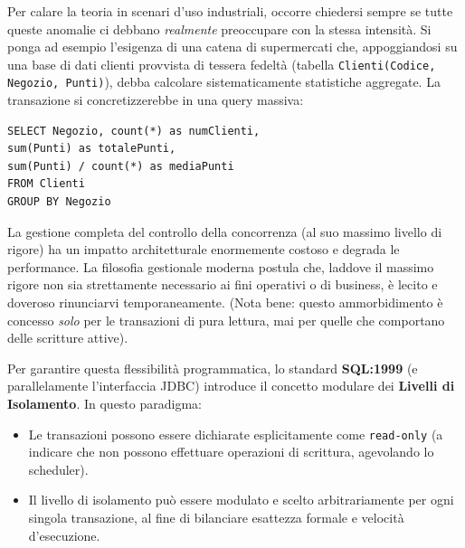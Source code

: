 Per calare la teoria in scenari d'uso industriali, occorre chiedersi sempre se tutte queste anomalie ci debbano \textit{realmente} preoccupare con la stessa intensità.
Si ponga ad esempio l'esigenza di una catena di supermercati che, appoggiandosi su una base di dati clienti provvista di tessera fedeltà (tabella \texttt{Clienti(Codice, Negozio, Punti)}), debba calcolare sistematicamente statistiche aggregate. La transazione si concretizzerebbe in una query massiva:
\begin{verbatim}
SELECT Negozio, count(*) as numClienti,
sum(Punti) as totalePunti,
sum(Punti) / count(*) as mediaPunti
FROM Clienti
GROUP BY Negozio
\end{verbatim}

La gestione completa del controllo della concorrenza (al suo massimo livello di rigore) ha un impatto architetturale enormemente costoso e degrada le performance. La filosofia gestionale moderna postula che, laddove il massimo rigore non sia strettamente necessario ai fini operativi o di business, è lecito e doveroso rinunciarvi temporaneamente. (Nota bene: questo ammorbidimento è concesso \textit{solo} per le transazioni di pura lettura, mai per quelle che comportano delle scritture attive).

Per garantire questa flessibilità programmatica, lo standard \textbf{SQL:1999} (e parallelamente l'interfaccia JDBC) introduce il concetto modulare dei \textbf{Livelli di Isolamento}. In questo paradigma:
\begin{itemize}
    \item Le transazioni possono essere dichiarate esplicitamente come \texttt{read-only} (a indicare che non possono effettuare operazioni di scrittura, agevolando lo scheduler).
    \item Il livello di isolamento può essere modulato e scelto arbitrariamente per ogni singola transazione, al fine di bilanciare esattezza formale e velocità d'esecuzione.
\end{itemize}

